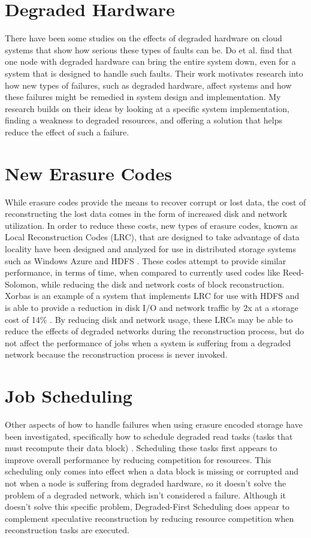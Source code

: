 \documentclass{ucetd}
\begin{document}
\section{Degraded Hardware}

There have been some studies on the effects of degraded hardware on cloud
systems that show how serious these types of faults can be. Do et al. \cite{Do}
find that one node with degraded hardware can bring the entire system
down, even for a system that is designed to handle such faults. Their work
motivates research into how new types of failures, such as degraded hardware,
affect systems and how these failures might be remedied in system design and
implementation. My research builds on their ideas by looking at a specific
system implementation, finding a weakness to degraded resources, and offering a
solution that helps reduce the effect of such a failure.

\section{New Erasure Codes}

While erasure codes provide the means to recover corrupt or lost data, the cost
of reconstructing the lost data comes in the form of increased disk and network
utilization. In order to reduce these costs, new types of erasure codes, known
as Local Reconstruction Codes (LRC), that are designed to take advantage of data
locality have been designed and analyzed for use in distributed storage systems
such as Windows Azure \cite{Huang} and HDFS \cite{Sathiamoorthy}. These codes
attempt to provide similar performance, in terms of time, when compared to
currently used codes like Reed-Solomon, while reducing the disk and network
costs of block reconstruction. Xorbas is an example of a system that implements
LRC for use with HDFS and is able to provide a reduction in disk I/O and network
traffic by 2x at a storage cost of 14\%  \cite{Sathiamoorthy}. By reducing disk
and network usage, these LRCs may be able to reduce the effects of degraded
networks during the reconstruction process, but do not affect the performance of
jobs when a system is suffering from a degraded network because the
reconstruction process is never invoked.

\section{Job Scheduling}

Other aspects of how to handle failures when using erasure encoded storage have
been investigated, specifically how to schedule degraded read tasks (tasks that
must recompute their data block) \cite{Li}. Scheduling these tasks first appears
to improve overall performance by reducing competition for resources. This
scheduling only comes into effect when a data block is missing or corrupted and
not when a node is suffering from degraded hardware, so it doesn't solve the
problem of a degraded network, which isn't considered a failure. Although it
doesn't solve this specific problem, Degraded-First Scheduling does appear to
complement speculative reconstruction by reducing resource competition when
reconstruction tasks are executed.
\end{document}
